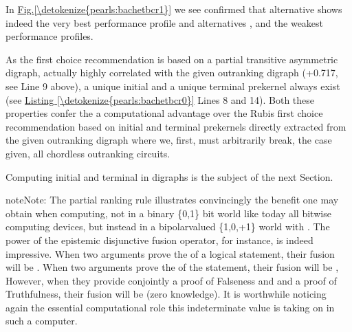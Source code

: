 \documentclass[a4paper,12pt,english]{sphinxhowto}
\begin{document}
\sphinxAtStartPar
In \hyperref[\detokenize{pearls:bachetbcr1}]{Fig.\@ \ref{\detokenize{pearls:bachetbcr1}}} we see confirmed that alternative  shows indeed the very best performance profile and alternatives ,  and  the weakest performance profiles.

\sphinxAtStartPar
As the  first choice recommendation is based on a partial transitive asymmetric digraph, actually highly correlated with the given outranking digraph  (+0.717, see Line 9 above), a unique initial and a unique terminal prekernel always exist (see \hyperref[\detokenize{pearls:bachetbcr0}]{Listing \ref{\detokenize{pearls:bachetbcr0}}} Lines 8 and 14). Both these properties confer the  a computational advantage over the Rubis first choice recommendation based on initial and terminal prekernels directly extracted from the given outranking digraph where we, first, must arbitrarily break, the case given, all chordless outranking circuits.

\sphinxAtStartPar
Computing initial and terminal  in digraphs is the subject of the next Section.

\begin{sphinxadmonition}{note}{Note:}
\sphinxAtStartPar
The partial  ranking rule illustrates convincingly the benefit one may obtain when computing, not in a binary \{0,1\} bit world like today all bit\sphinxhyphen{}wise computing devices, but instead in a bipolar\sphinxhyphen{}valued \{\sphinxhyphen{}1,0,+1\} world with . The power of the epistemic disjunctive fusion operator, for instance, is indeed impressive. When two arguments prove the  of a logical statement, their fusion will be . When two arguments prove the  of the statement, their fusion will be , However, when they provide conjointly a proof of Falseness and and a proof of Truthfulness, their fusion will be  (zero knowledge). It is worthwhile noticing again the essential computational role this indeterminate  value is taking on in such a  computer.
\end{sphinxadmonition}
\end{document}
